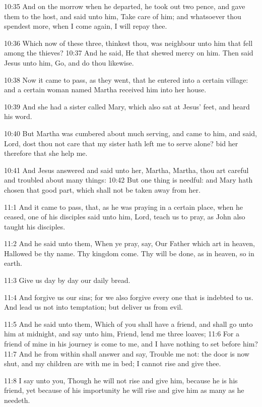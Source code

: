 10:35 And on the morrow when he departed, he took out two pence, and gave them to the host, and said unto him, Take care of him; and whatsoever thou spendest more, when I come again, I will repay thee.

10:36 Which now of these three, thinkest thou, was neighbour unto him that fell among the thieves?  10:37 And he said, He that shewed mercy on him. Then said Jesus unto him, Go, and do thou likewise.

10:38 Now it came to pass, as they went, that he entered into a certain village: and a certain woman named Martha received him into her house.

10:39 And she had a sister called Mary, which also sat at Jesus' feet, and heard his word.

10:40 But Martha was cumbered about much serving, and came to him, and said, Lord, dost thou not care that my sister hath left me to serve alone?  bid her therefore that she help me.

10:41 And Jesus answered and said unto her, Martha, Martha, thou art careful and troubled about many things: 10:42 But one thing is needful: and Mary hath chosen that good part, which shall not be taken away from her.

11:1 And it came to pass, that, as he was praying in a certain place, when he ceased, one of his disciples said unto him, Lord, teach us to pray, as John also taught his disciples.

11:2 And he said unto them, When ye pray, say, Our Father which art in heaven, Hallowed be thy name. Thy kingdom come. Thy will be done, as in heaven, so in earth.

11:3 Give us day by day our daily bread.

11:4 And forgive us our sins; for we also forgive every one that is indebted to us. And lead us not into temptation; but deliver us from evil.

11:5 And he said unto them, Which of you shall have a friend, and shall go unto him at midnight, and say unto him, Friend, lend me three loaves; 11:6 For a friend of mine in his journey is come to me, and I have nothing to set before him?  11:7 And he from within shall answer and say, Trouble me not: the door is now shut, and my children are with me in bed; I cannot rise and give thee.

11:8 I say unto you, Though he will not rise and give him, because he is his friend, yet because of his importunity he will rise and give him as many as he needeth.

